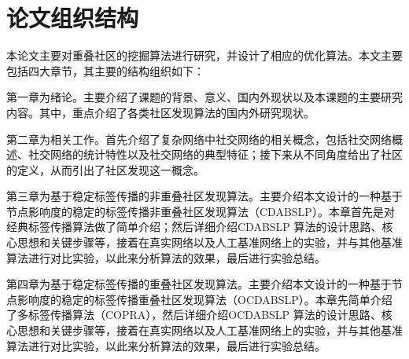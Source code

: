 \section{论文组织结构}

本论文主要对重叠社区的挖掘算法进行研究，并设计了相应的优化算法。本文主要包括四大章节，其主要的结构组织如下：

第一章为绪论。主要介绍了课题的背景、意义、国内外现状以及本课题的主要研究内容。其中，重点介绍了各类社区发现算法的国内外研究现状。

第二章为相关工作。首先介绍了复杂网络中社交网络的相关概念，包括社交网络概述、社交网络的统计特性以及社交网络的典型特征；接下来从不同角度给出了社区的定义，从而引出了社区发现这一概念。

第三章为基于稳定标签传播的非重叠社区发现算法。主要介绍本文设计的一种基于节点影响度的稳定的标签传播非重叠社区发现算法（CDABSLP）。本章首先是对经典标签传播算法做了简单介绍；然后详细介绍CDABSLP 算法的设计思路、核心思想和关键步骤等，接着在真实网络以及人工基准网络上的实验，并与其他基准算法进行对比实验，以此来分析算法的效果，最后进行实验总结。

第四章为基于稳定标签传播的重叠社区发现算法。主要介绍本文设计的一种基于节点影响度的稳定的标签传播重叠社区发现算法（OCDABSLP）。本章先简单介绍了多标签传播算法（COPRA），然后详细介绍OCDABSLP 算法的设计思路、核心思想和关键步骤等，接着在真实网络以及人工基准网络上的实验，并与其他基准算法进行对比实验，以此来分析算法的效果，最后进行实验总结。